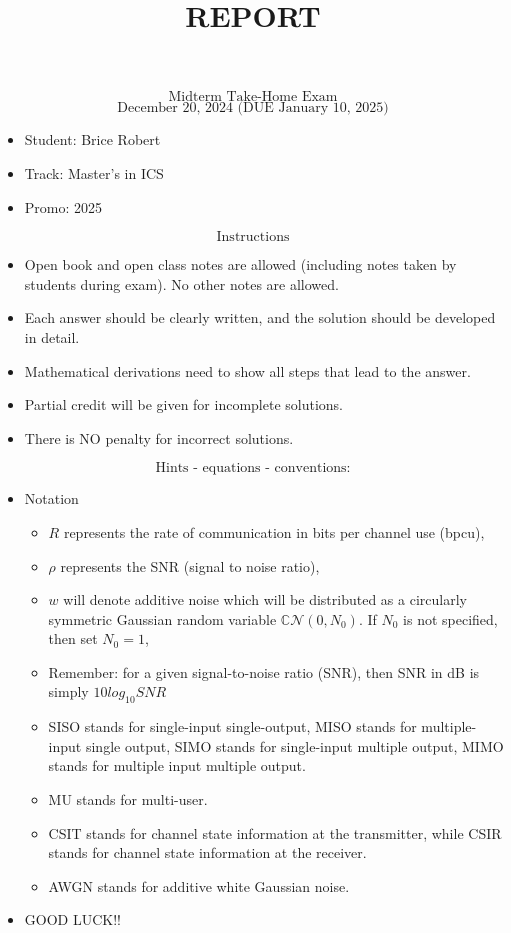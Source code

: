 \documentclass[11pt]{article}
\title{REPORT}
\providecommand{\tightlist}{%
      \setlength{\itemsep}{0pt}\setlength{\parskip}{0pt}}
\begin{document}
    
    \maketitle
    
    

    
    \[
\text{Midterm Take-Home Exam}
\] \[
\text{December 20, 2024 (DUE January 10, 2025)}
\]

    \begin{itemize}
\tightlist
\item
  Student: Brice Robert
\item
  Track: Master's in ICS
\item
  Promo: 2025
\end{itemize}

    \[
\text{Instructions}
\]

\begin{itemize}
\item
  Open book and open class notes are allowed (including notes taken by
  students during exam). No other notes are allowed.
\item
  Each answer should be clearly written, and the solution should be
  developed in detail.
\item
  Mathematical derivations need to show all steps that lead to the
  answer.
\item
  Partial credit will be given for incomplete solutions.
\item
  There is NO penalty for incorrect solutions.
\end{itemize}

    \[
\text{Hints - equations - conventions:}
\]

\begin{itemize}
\item
  Notation

  \begin{itemize}
  \item
    \(R\) represents the rate of communication in bits per channel use
    (bpcu),
  \item
    \(\rho\) represents the SNR (signal to noise ratio),
  \item
    \(w\) will denote additive noise which will be distributed as a
    circularly symmetric Gaussian random variable
    \(\mathbb{C}\mathcal{N}(0,N_0)\). If \(N_0\) is not specified, then
    set \(N_0 = 1\),
  \item
    Remember: for a given signal-to-noise ratio (SNR), then SNR in dB is
    simply \(10 log_{10} SNR\)
  \item
    SISO stands for single-input single-output, MISO stands for
    multiple-input single output, SIMO stands for single-input multiple
    output, MIMO stands for multiple input multiple output.
  \item
    MU stands for multi-user.
  \item
    CSIT stands for channel state information at the transmitter, while
    CSIR stands for channel state information at the receiver.
  \item
    AWGN stands for additive white Gaussian noise.
  \end{itemize}
\item
  GOOD LUCK!!
\end{itemize}
\end{document}
